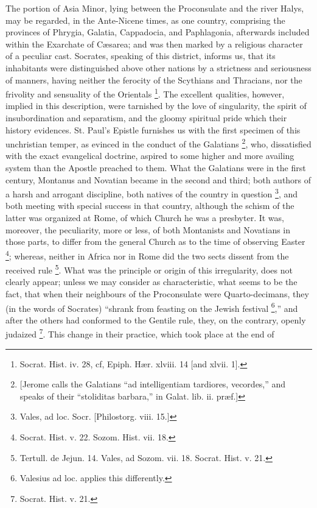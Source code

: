 The portion of Asia Minor, lying between the Proconsulate and the
river Halys, may be regarded, in the Ante-Nicene times, as one
country, comprising the provinces of Phrygia, Galatia, Cappadocia, and
Paphlagonia, afterwards included within the Exarchate of Cæsarea; and
was then marked by a religious character of a peculiar cast. Socrates,
speaking of this district, informs us, that its inhabitants were
distinguished above other nations by a strictness and seriousness of
manners, having neither the ferocity of the Scythians and Thracians,
nor the frivolity and sensuality of the Orientals \footnote{Socrat. Hist. iv. 28, cf, Epiph. Hær.
xlviii. 14 [and xlvii. 1].}. The excellent qualities, however, implied in this
description, were tarnished by the love of singularity, the spirit of
insubordination and separatism, and the gloomy spiritual pride which
their history evidences. St. Paul's Epistle furnishes us with the
first specimen of this unchristian temper, as evinced in the conduct
of the Galatians \footnote{[Jerome calls the Galatians ``ad
intelligentiam tardiores, vecordes,'' and speaks of their ``stoliditas
barbara,'' in Galat. lib. ii. præf.]}, who,
dissatisfied with the exact evangelical doctrine, aspired to some
higher and more availing system than the Apostle preached to them.
What the Galatians were in the first century, Montanus and Novatian
became in the second and third; both authors of a harsh and arrogant
discipline, both natives of the country in question \footnote{Vales, ad loc. Socr. [Philostorg. viii.
15.]}, and both meeting with special success in that country,
although the schism of the latter was organized at Rome, of which
Church he was a presbyter. It was, moreover, the peculiarity, more or
less, of both Montanists and Novatians in those parts, to differ from
the general Church as to the time of observing Easter \footnote{Socrat. Hist. v. 22. Sozom. Hist. vii. 18.}; whereas, neither in Africa nor in Rome did the two sects
dissent from the received rule \footnote{Tertull. de Jejun. 14. Vales, ad Sozom.
vii. 18. Socrat. Hist. v. 21.}. What was the principle or origin of this irregularity, does
not clearly appear; unless we may consider as characteristic, what
seems to be the fact, that when their neighbours of the Proconsulate
were Quarto-decimans, they (in the words of Socrates) ``shrank
from feasting on the Jewish festival \footnote{Valesius ad loc. applies this differently.},'' and after the others had conformed to the Gentile rule,
they, on the contrary, openly judaized \footnote{Socrat. Hist. v. 21.}. This change in their practice, which took place at the end of
